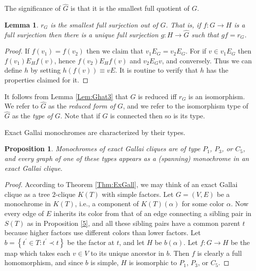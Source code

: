 \documentclass[12pt]{amsart}
\theoremstyle{plain}
\newtheorem{lemma}[theorem]{Lemma}
\newtheorem{proposition}[theorem]{Proposition}
\numberwithin{equation}{section}
\begin{document}
The significance of $\widehat{G}$ is that it is the smallest full quotient of
$G$.

\begin{lemma}\label{Lm:Folklore2}
\label{Lem:Ghat3}$r_{G}$ is the smallest full surjection out of $G$. That is,
if $f:G\rightarrow H$ is a full surjection then there is a unique full
surjection $g:H\rightarrow\widehat{G}$ such that $gf=r_{G}$.
\end{lemma}

\begin{proof}
If $f\left(  v_{1}\right)  =f\left(  v_{2}\right)  $ then we claim that
$v_{1}E_{G}=v_{2}E_{G}$. For if $v\in v_{1}E_{G}$ then $f\left(  v_{1}\right)
E_{H}f\left(  v\right)  $, hence $f\left(  v_{2}\right)  E_{H}f\left(
v\right)  $ and $v_{2}E_{G}v$, and conversely. Thus we can define $h$ by
setting $h\left(  f\left(  v\right)  \right)  \equiv vE$. It is routine to
verify that $h$ has the properties claimed for it.
\end{proof}

It follows from Lemma \ref{Lem:Ghat3} that $G$ is reduced iff $r_{G}$ is an
isomorphism. We refer to $\widehat{G}$ as the \emph{reduced form of }$G$, and
we refer to the isomorphism type of $\widehat{G}$ as the \emph{type of }$G$.
Note that if $G$ is connected then so is its type.

Exact Gallai monochromes are characterized by their types.

\begin{proposition}
\label{Pr:ExGallMon}Monochromes of exact Gallai cliques are of type $P_{1}$,
$P_{3}$, or $C_{5}$, and every graph of one of these types appears as a
(spanning) monochrome in an exact Gallai clique.
\end{proposition}

\begin{proof}
According to Theorem \ref{Thm:ExGall}, we may think of an exact Gallai clique
as a tree $2$-clique $K\left(  T\right)  $ with simple factors. Let $G=\left(
V,E\right)  $ be a monochrome in $K\left(  T\right)  $, i.e., a component of
$K\left(  T\right)  \left(  \alpha\right)  $ for some color $\alpha$. Now
every edge of $E$ inherits its color from that of an edge connecting a sibling
pair in $S\left(  T\right)  $ as in Proposition \ref{5}, and all these sibling
pairs have a common parent $t$ because higher factors use different colors
than lower factors. Let $b=\left\{  t^{\prime}\in T:t^{\prime}\prec t\right\}
$ be the factor at $t$, and let $H$ be $b\left(  \alpha\right)  $. Let
$f:G\rightarrow H$ be the map which takes each $v\in V$ to its unique ancestor
in $b$. Then $f$ is clearly a full homomorphism, and since $b$ is simple, $H$
is isomorphic to $P_{1}$, $P_{3}$, or $C_{5}$.
\end{proof}
\end{document}
